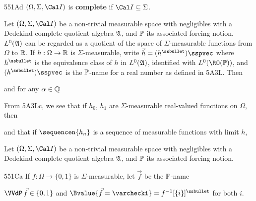 \spheader 551Ad $(\Omega,\Sigma,\Cal I)$ is
{\bf complete} if $\Cal I\subseteq\Sigma$.


 Let $(\Omega,\Sigma,\Cal I)$ be a
non-trivial measurable space
with negligibles with a Dedekind complete quotient algebra $\frak A$,
and $\Bbb P$ its associated forcing notion.
$L^0(\frak A)$ can be regarded as a quotient of
the space of $\Sigma$-measurable functions from $\Omega$ to
$\Bbb R$.   If $h:\Omega\to\Bbb R$ is $\Sigma$-measurable, write
$\vec h=(h^{\ssbullet})\sspvec$ where $h^{\ssbullet}$ is the equivalence
class of $h$ in $L^0(\frak A)$, identified with $L^0(\RO(\Bbb P))$, and
$(h^{\ssbullet})\sspvec$ is the $\Bbb P$-name for a real number as
defined in 5A3L.   Then


\noindent and for any $\alpha\in\Bbb Q$


\noindent From 5A3Lc, we see that if $h_0$, $h_1$ are
$\Sigma$-measurable real-valued functions on $\Omega$, then


\noindent and that if $\sequencen{h_n}$ is a sequence of measurable
functions with limit $h$,


 Let $(\Omega,\Sigma,\Cal I)$ be a
non-trivial measurable space
with negligibles with a Dedekind complete quotient algebra $\frak A$,
and $\Bbb P$ its associated forcing notion.

\spheader 551Ca If $f:\Omega\to\{0,1\}$ is $\Sigma$-measurable, let
$\vec f$ be the $\Bbb P$-name


\noindent{}$\VVdP\,\vec f\in\{0,1\}$ and
$\Bvalue{\vec f=\varchecki}=f^{-1}[\{i\}]^{\ssbullet}$ for both $i$.

